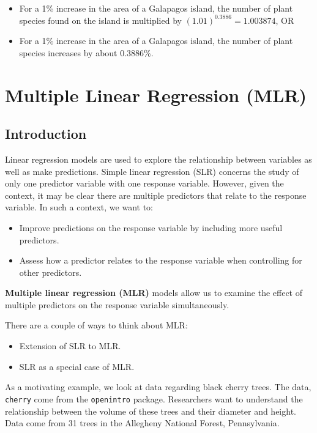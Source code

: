 \documentclass[
]{book}
\providecommand{\tightlist}{%
  \setlength{\itemsep}{0pt}\setlength{\parskip}{0pt}}
\begin{document}
\begin{itemize}
\item
  For a 1\% increase in the area of a Galapagos island, the number of plant species found on the island is multiplied by \((1.01)^{0.3886} = 1.003874\), OR
\item
  For a 1\% increase in the area of a Galapagos island, the number of plant species increases by about 0.3886\%.
\end{itemize}

\hypertarget{mlr}{%
\chapter{Multiple Linear Regression (MLR)}\label{mlr}}

\hypertarget{introduction-5}{%
\section{Introduction}\label{introduction-5}}

Linear regression models are used to explore the relationship between variables as well as make predictions. Simple linear regression (SLR) concerns the study of only one predictor variable with one response variable. However, given the context, it may be clear there are multiple predictors that relate to the response variable. In such a context, we want to:

\begin{itemize}
\tightlist
\item
  Improve predictions on the response variable by including more useful predictors.
\item
  Assess how a predictor relates to the response variable when controlling for other predictors.
\end{itemize}

\textbf{Multiple linear regression (MLR)} models allow us to examine the effect of multiple predictors on the response variable simultaneously.

There are a couple of ways to think about MLR:

\begin{itemize}
\tightlist
\item
  Extension of SLR to MLR.
\item
  SLR as a special case of MLR.
\end{itemize}

As a motivating example, we look at data regarding black cherry trees. The data, \texttt{cherry} come from the \texttt{openintro} package. Researchers want to understand the relationship between the volume of these trees and their diameter and height. Data come from 31 trees in the Allegheny National Forest, Pennsylvania.
\end{document}
